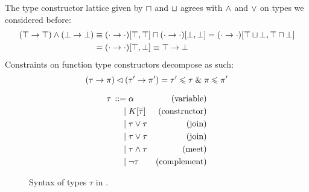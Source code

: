 \begin{example}
    The type constructor lattice given by $\sqcap$ and $\sqcup$ agrees with $\land$ and $\lor$ on types we considered before:
    \begin{align*}
       (\top \to \top) \land (\bot \to \bot) 
       &\equiv (\cdot \to \cdot)[\top, \top] \sqcap (\cdot \to \cdot)[\bot, \bot] = (\cdot \to \cdot)[\top \sqcup \bot, \top \sqcap \bot] \\
       &= (\cdot \to \cdot)[\top, \bot] \equiv \top \to \bot 
    \end{align*}
    Constraints on function type constructors decompose as such:
    $$ (\tau \to \pi) \lhd (\tau' \to \pi') = \tau' \leqslant \tau \;\&\; \pi \leqslant \pi' $$
\end{example}

\begin{figure}
    \centering
    \begin{align*}
    {\tau} \,::=&\; 
             \alpha & \text{(variable)}
    \\ \mid&\; K[\overline \tau] & \text{(constructor)}
    \\ \mid&\; \tau \lor \tau & \text{(join)}
    \\ \mid&\; \tau \lor \tau & \text{(join)}
    \\ \mid&\; \tau \land \tau & \text{(meet)}
    \\ \mid&\; \lnot \tau & \text{(complement)}
    \end{align*}
    \caption{Syntax of types $\tau$ in \inference{}.}
    \label{fig:signature-types}
\end{figure}

